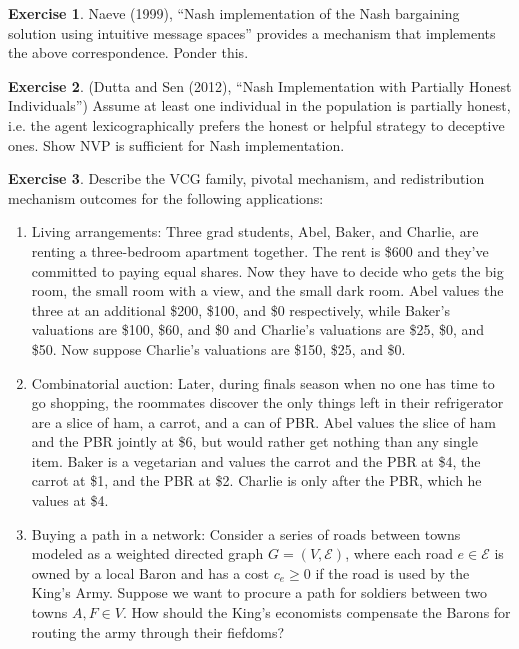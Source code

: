 \documentclass[letter, 10pt]{article}
\theoremstyle{definition}
\newtheorem{exercise}{Exercise}[section]
\begin{document}
\begin{spacing}{1.1}
\begin{exercise}
  Naeve (1999), ``Nash implementation of the Nash bargaining solution using
  intuitive message spaces'' provides a mechanism that implements the above
  correspondence. Ponder this.
\end{exercise}

\begin{exercise}
  (Dutta and Sen (2012), ``Nash Implementation with Partially Honest
  Individuals'') Assume at least one individual in the population is
  partially honest, i.e. the agent lexicographically prefers the honest or
  helpful strategy to deceptive ones. Show NVP is sufficient for Nash
  implementation.
\end{exercise}


\begin{exercise}
  Describe the VCG family, pivotal mechanism, and redistribution mechanism
  outcomes for the following applications:
  \begin{enumerate}
  \item Living arrangements: Three grad students, Abel, Baker, and Charlie,
    are renting a three-bedroom apartment together. The rent is \$600 and
    they've committed to paying equal shares. Now they have to decide who
    gets the big room, the small room with a view, and the small dark
    room. Abel values the three at an additional \$200, \$100, and \$0
    respectively, while Baker's valuations are \$100, \$60, and \$0 and Charlie's
    valuations are \$25, \$0, and \$50. Now suppose Charlie's valuations
    are \$150, \$25, and \$0.
  \item Combinatorial auction: Later, during finals season when no one has
    time to go shopping, the roommates discover the only things left in
    their refrigerator are a slice of ham, a carrot, and a can of PBR. Abel
    values the slice of ham and the PBR jointly at \$6, but would rather
    get nothing than any single item. Baker is a vegetarian and values the
    carrot and the PBR at \$4, the carrot at \$1, and the PBR at
    \$2. Charlie is only after the PBR, which he values at \$4.
  \item Buying a path in a network: Consider a series of roads between
    towns modeled as a weighted directed graph $G=(V,\mathcal{E})$, where each road
    $e\in \mathcal{E}$ is owned by a local Baron and has a cost $c_e \geq 0$ if the
    road is used by the King's Army. Suppose we want to procure a path for
    soldiers between two towns $A,F \in V$. How should the King's
    economists compensate the Barons for routing the army through their
    fiefdoms?

\end{enumerate}
\end{exercise}
\end{spacing}
\end{document}
